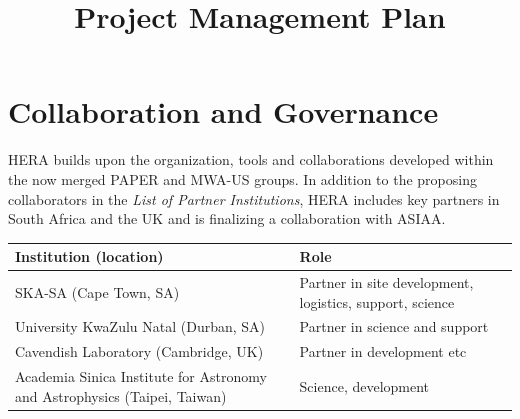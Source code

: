 \documentclass[preprint]{aastex}
\begin{document}
\title{Project Management Plan}


\section{Collaboration and Governance}
HERA builds upon the organization, tools and collaborations developed within the now merged 
PAPER and MWA-US groups.
In addition to the proposing collaborators in the {\em List of Partner Institutions},
HERA includes key partners in South Africa and the UK and is finalizing a collaboration with ASIAA.
\begin{table}[h]
\begin{tabular}{| p{} | p{} |}\hline
\textbf{Institution (location)} & \textbf{Role} \\ \hline
SKA-SA (Cape Town, SA) & Partner in site development, logistics, support, science \\ \hline
University KwaZulu Natal (Durban, SA) & Partner in science and support \\ \hline
Cavendish Laboratory (Cambridge, UK) & Partner in development etc \\ \hline
Academia Sinica Institute for Astronomy and Astrophysics (Taipei, Taiwan) & Science, development \\ \hline
\end{tabular}
\label{tab:otherpartners}
\end{table}
\end{document}
